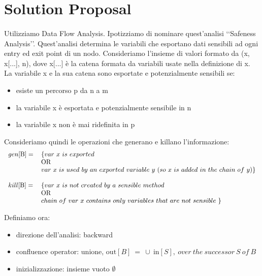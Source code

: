 \documentclass[letterpaper,twocolumn,10pt]{article}
\begin{document}
\section{Solution Proposal}
\paragraph{}
Utilizziamo Data Flow Analysis. Ipotizziamo di nominare quest'analisi \lq\lq Safeness Analysis\rq\rq. Quest'analisi determina le variabili che esportano dati sensibili ad ogni entry ed exit point di un nodo. Consideriamo l'insieme di valori formato da (x, x[...], n), dove x[...] \`e la catena formata da variabili usate nella definizione di x. La variabile x e la sua catena sono esportate e potenzialmente sensibili se:
\begin{itemize}
\item esiste un percorso p da n a m
\item la variabile x \`e esportata e potenzialmente sensibile in n
\item la variabile x non \`e mai ridefinita in p
\end{itemize}

Consideriamo quindi le operazioni che generano e killano l'informazione:\\
\begin{align*}
\begin{tabular}{  l l }
	$ gen[\text{B}]= $ & $ \{ var\ x\ is\ exported $\\ 
	& OR \\
	& $ var\ x\ is\ used\ by\ an\ exported\ variable\ y\ ( so\ x\ is\ added\ in\ the\ chain\ of\ y ) \} $ \\
	& \\                  
	$  kill[\text{B}]= $ & $ \{ var\ x\ is\ not\ created\ by\ a\ sensible\ method\ $\\
    & OR \\ 
    & $ chain\ of\ var\ x\ contains\ only\ variables\ that\ are\ not\ sensible\ \} $ \\
\end{tabular}
\end{align*}

Definiamo ora: 
\begin{itemize}
\item direzione dell'analisi: backward
\item confluence operator: unione, $ \text{out}[B]\ =\ \cup\ \text{in}[S],\ over\ the\ successor\ S\ of\ B\  $
\item inizializzazione: insieme vuoto $ \emptyset $
\end{itemize}
\end{document}
